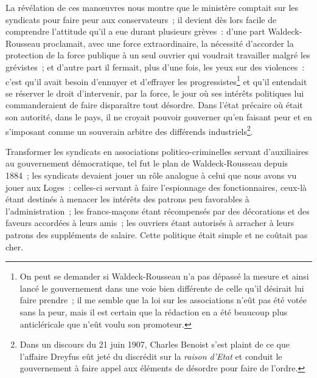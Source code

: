 \documentclass[french,twoside]{book} %
\begin{document}
La révélation de ces manœuvres nous montre que le ministère comptait sur les syndicats pour faire peur aux conservateurs ; il devient dès lors facile de comprendre l’attitude qu’il a eue durant plusieurs grèves : d’une part Waldeck-Rousseau proclamait, avec une force extraordinaire, la nécessité d’accorder la protection de la force publique à un seul ouvrier qui voudrait travailler malgré les grévistes ; et d’autre part il fermait, plus d’une fois, les yeux sur des violences : c’est qu’il avait besoin d’ennuyer et d’effrayer les progressistes\footnote{ \noindent On peut se demander si Waldeck-Rousseau n’a pas dépassé la mesure et ainsi lancé le gouvernement dans une voie bien différente de celle qu’il désirait lui faire prendre ; il me semble que la loi sur les associations n’eût pas été votée sans la peur, mais il est certain que la rédaction en a été beaucoup plus anticléricale que n’eût voulu son promoteur.
 } et qu’il entendait se réserver le droit d’intervenir, par la force, le jour où ses intérêts politiques lui commanderaient de faire disparaître tout désordre. Dans l’état précaire où était son autorité, dans le pays, il ne croyait pouvoir gouverner qu’en faisant peur et en s’imposant comme un souverain arbitre des différends industriels\footnote{ \noindent Dans un discours du 21 juin 1907, Charles Benoist s’est plaint de ce que l’affaire Dreyfus eût jeté du discrédit sur la \emph{raison d’Etat} et conduit le gouvernement à faire appel aux éléments de désordre pour faire de l’ordre.
 }.\par
 Transformer les syndicats en associations politico-criminelles servant d’auxiliaires au gouvernement démocratique, tel fut le plan de Waldeck-Rousseau depuis 1884 ; les syndicats devaient jouer un rôle analogue à celui que nous avons vu jouer aux Loges : celles-ci servant à faire l’espionnage des fonctionnaires, ceux-là étant destinés à menacer les intérêts des patrons peu favorables à l’administration ; les francs-maçons étant récompensés par des décorations et des faveurs accordées à leurs amis ; les ouvriers étant autorisés à arracher à leurs patrons des suppléments de salaire. Cette politique était simple et ne coûtait pas cher.\par
\end{document}
